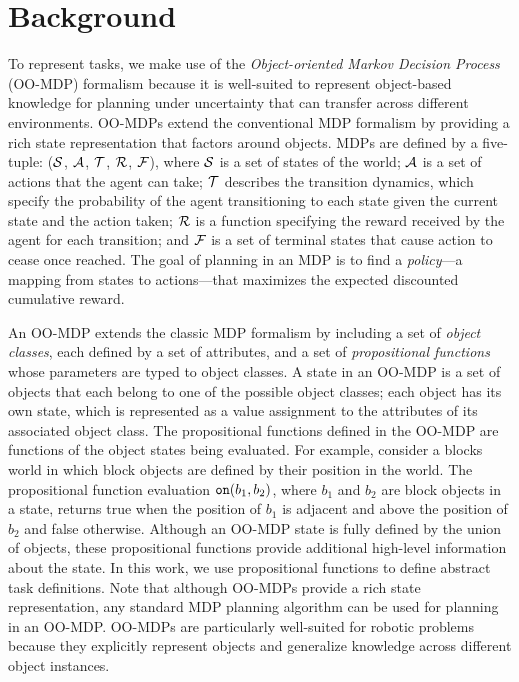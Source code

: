\documentclass[conference]{IEEEtran}
\newcommand{\stnote}[1]{\textcolor{Blue}{\textbf{ST: #1}}}
\begin{document}


\section{Background}
To represent tasks, we make use of the {\em Object-oriented Markov Decision Process} (OO-MDP) formalism \cite{diuk08b} because it is well-suited to represent object-based knowledge for planning under uncertainty that can transfer across different environments. OO-MDPs extend the conventional MDP formalism by providing a rich state representation that factors around objects. MDPs are defined by a five-tuple: (${\cal S}$, ${\cal A}$, ${\cal T}$, ${\cal R}$, ${\cal F}$), where ${\cal S}$ is a set of states of the world; ${\cal A}$ is a set of actions that the agent can take; ${\cal T}$ describes the transition dynamics, which specify the probability of the agent transitioning to each state given the current state and the action taken; ${\cal R}$ is a function specifying the reward received by the agent for each transition; and ${\cal F}$ is a set of terminal states that cause action to cease once reached. The goal of planning in an MDP is to find a {\em policy}---a mapping from states to actions---that maximizes the expected discounted cumulative reward.

An OO-MDP extends the classic MDP formalism by including a set of {\em object classes}, each defined by a set of attributes, and a set of \emph{propositional functions} whose parameters are typed to object classes. A state in an OO-MDP is a set of objects that each belong to one of the possible object classes; each object has its own state, which is represented as a value assignment to the attributes of its associated object class. The propositional functions defined in the OO-MDP are functions of the object states being evaluated. For example, consider a blocks world in which block objects are defined by their position in the world. The propositional function evaluation ${\tt on}(b_1, b_2)$, where $b_1$ and $b_2$ are block objects in a state, returns {\sf true} when the position of $b_1$ is adjacent and above the position of $b_2$ and false otherwise. Although an OO-MDP state is fully defined by the union of objects, these propositional functions provide additional high-level information about the state. In this work, we use propositional functions to define abstract task definitions.  Note that although OO-MDPs provide a rich state representation, any standard MDP planning algorithm can be used for planning in an OO-MDP. OO-MDPs are particularly well-suited for robotic problems because they explicitly represent objects and generalize knowledge across different object instances. %
\end{document}
